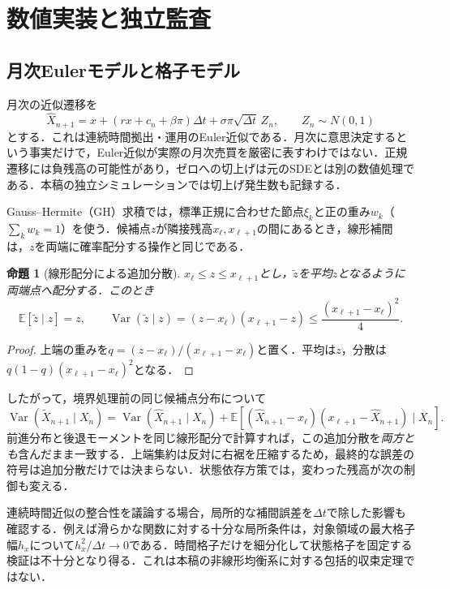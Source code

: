 \documentclass[10pt,a4paper]{article}
\numberwithin{equation}{section}
\numberwithin{table}{section}
\numberwithin{figure}{section}
\theoremstyle{plain}
\newtheorem{proposition}{命題}
\theoremstyle{definition}
\newcommand{\E}{\mathbb{E}}
\DeclareMathOperator{\Var}{Var}
\begin{document}
\section{数値実装と独立監査}
\label{sec:interpolation}
\subsection{月次Eulerモデルと格子モデル}
月次の近似遷移を
\begin{equation}
\widehat X_{n+1}=x+(rx+c_n+\beta\pi)\Delta t+
\sigma\pi\sqrt{\Delta t}\,Z_n,\qquad Z_n\sim N(0,1)
\label{eq:euler}
\end{equation}
とする．これは連続時間拠出・運用のEuler近似である．月次に意思決定するという事実だけで，Euler近似が実際の月次売買を厳密に表すわけではない．正規遷移には負残高の可能性があり，ゼロへの切上げは元のSDEとは別の数値処理である．本稿の独立シミュレーションでは切上げ発生数も記録する．

Gauss--Hermite（GH）求積では，標準正規に合わせた節点$\xi_k$と正の重み$w_k$（$\sum_kw_k=1$）を使う．候補点$z$が隣接残高$x_\ell,x_{\ell+1}$の間にあるとき，線形補間は，$z$を両端に確率配分する操作と同じである．
\begin{proposition}[線形配分による追加分散]
\label{prop:interpolation}
$x_\ell\leq z\leq x_{\ell+1}$とし，$\widetilde z$を平均$z$となるように両端点へ配分する．このとき
\begin{equation}
\E[\widetilde z\mid z]=z,\qquad
\Var(\widetilde z\mid z)=(z-x_\ell)(x_{\ell+1}-z)
\leq\frac{(x_{\ell+1}-x_\ell)^2}{4}.
\label{eq:interpvar}
\end{equation}
\end{proposition}
\begin{proof}
上端の重みを$q=(z-x_\ell)/(x_{\ell+1}-x_\ell)$と置く．平均は$z$，分散は$q(1-q)(x_{\ell+1}-x_\ell)^2$となる．
\end{proof}
したがって，境界処理前の同じ候補点分布について
\begin{equation}
\Var(\widetilde X_{n+1}\mid X_n)
=\Var(\widehat X_{n+1}\mid X_n)+
\E[(\widehat X_{n+1}-x_\ell)(x_{\ell+1}-\widehat X_{n+1})\mid X_n].
\label{eq:artificial}
\end{equation}
前進分布と後退モーメントを同じ線形配分で計算すれば，この追加分散を\emph{両方とも}含んだまま一致する．上端集約は反対に右裾を圧縮するため，最終的な誤差の符号は追加分散だけでは決まらない．状態依存方策では，変わった残高が次の制御も変える．

連続時間近似の整合性を議論する場合，局所的な補間誤差を$\Delta t$で除した影響も確認する．例えば滑らかな関数に対する十分な局所条件は，対象領域の最大格子幅$h_x$について$h_x^2/\Delta t\to0$である．時間格子だけを細分化して状態格子を固定する検証は不十分となり得る．これは本稿の非線形均衡系に対する包括的収束定理ではない．
\end{document}
